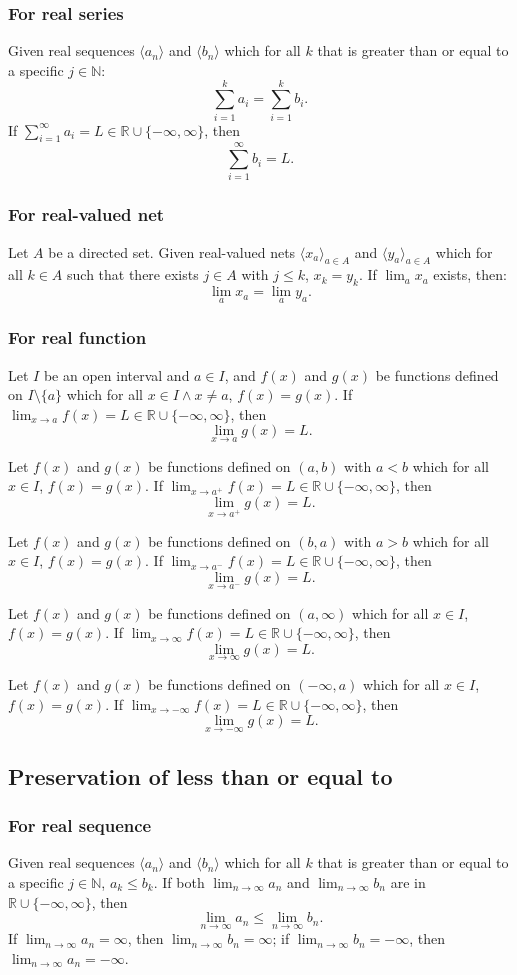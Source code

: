 \documentclass[a4paper,12pt]{report}
\begin{document}
\begin{itemize}
\begin{itemize}
\subsubsection{For real series}
Given real sequences $\langle a_n\rangle$ and $\langle b_n\rangle$ which for all $k$ that is greater than or equal to a specific $j\in \mathbb{N}$:
\[\sum_{i=1}^ka_i=\sum_{i=1}^kb_i.\]
If $\sum_{i=1}^{\infty}a_i=L\in\mathbb{R}\cup\{-\infty,\infty\}$, then
\[\sum_{i=1}^{\infty}b_i=L.\]
\subsubsection{For real-valued net}
Let $A$ be a directed set. Given real-valued nets $\langle x_a\rangle_{a\in A}$ and $\langle y_a\rangle_{a\in A}$ which for all $k\in A$ such that there exists $j\in A$ with $j\leq k$, $x_k=y_k$. If $\lim_{a}x_a$ exists, then:
\[\lim_{a}x_a=\lim_{a}y_a.\]
\subsubsection{For real function}
Let $I$ be an open interval and $a\in I$, and $f(x)$ and $g(x)$ be functions defined on $I\setminus\{a\}$ which for all $x\in I\land x\neq a$, $f(x)=g(x)$. If $\lim_{x\to a}f(x)=L\in\mathbb{R}\cup\{-\infty,\infty\}$, then
\[\lim_{x\to a}g(x)=L.\]

Let $f(x)$ and $g(x)$ be functions defined on $(a,b)$ with $a<b$ which for all $x\in I$, $f(x)=g(x)$. If $\lim_{x\to a^+}f(x)=L\in\mathbb{R}\cup\{-\infty,\infty\}$, then
\[\lim_{x\to a^+}g(x)=L.\]

Let $f(x)$ and $g(x)$ be functions defined on $(b,a)$ with $a>b$ which for all $x\in I$, $f(x)=g(x)$. If $\lim_{x\to a^-}f(x)=L\in\mathbb{R}\cup\{-\infty,\infty\}$, then
\[\lim_{x\to a^-}g(x)=L.\]

Let $f(x)$ and $g(x)$ be functions defined on $(a,\infty)$ which for all $x\in I$, $f(x)=g(x)$. If $\lim_{x\to\infty}f(x)=L\in\mathbb{R}\cup\{-\infty,\infty\}$, then
\[\lim_{x\to\infty}g(x)=L.\]

Let $f(x)$ and $g(x)$ be functions defined on $(-\infty,a)$ which for all $x\in I$, $f(x)=g(x)$. If $\lim_{x\to-\infty}f(x)=L\in\mathbb{R}\cup\{-\infty,\infty\}$, then
\[\lim_{x\to-\infty}g(x)=L.\]
\subsection{Preservation of less than or equal to}
\subsubsection{For real sequence}
Given real sequences $\langle a_n\rangle$ and $\langle b_n\rangle$ which for all $k$ that is greater than or equal to a specific $j\in \mathbb{N}$, $a_k\leq b_k$. If both $\lim_{n\to\infty}a_n$ and $\lim_{n\to\infty}b_n$ are in $\mathbb{R}\cup\{-\infty,\infty\}$, then
\[\lim_{n\to\infty}a_n\leq\lim_{n\to\infty}b_n.\]
If $\lim_{n\to\infty}a_n=\infty$, then $\lim_{n\to\infty}b_n=\infty$; if $\lim_{n\to\infty}b_n=-\infty$, then $\lim_{n\to\infty}a_n=-\infty$.

\end{itemize}
\end{itemize}
\end{document}
